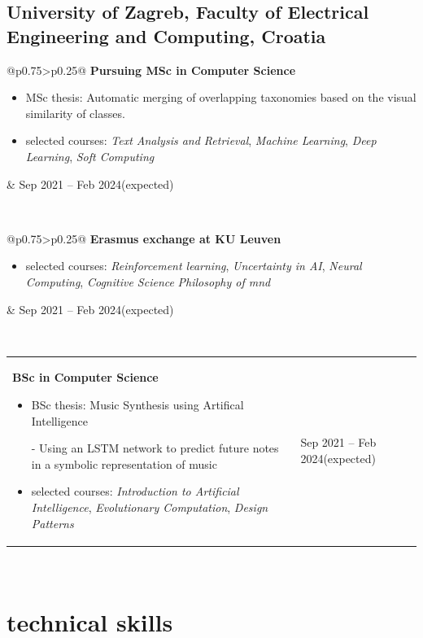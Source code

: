 \documentclass[a4paper]{article}
\makeatletter
\newlength{\tablewidth}
\newenvironment{period}[2]{%
\newcommand{\sarma}{#2}%
\setlength{\tablewidth}{\linewidth}
\addtolength{\tablewidth}{-2\tabcolsep}
\begin{tabular}{@{}p{0.75\tablewidth}>{\raggedleft\arraybackslash}p{0.25\tablewidth}@{}}%
#1 \newline
\begin{itemize}
}{%
\end{itemize} & \sarma \\%
\end{tabular}\\
}
\makeatother
\begin{document}
\subsection{\textbf{University of Zagreb, Faculty of Electrical Engineering and Computing}, Croatia}
\begin{period}{\textbf{Pursuing MSc in Computer Science}}{Sep 2021 -- Feb 2024\linebreak(expected)}
    \item MSc thesis: Automatic merging of overlapping taxonomies based on the visual similarity of classes.
    \item selected courses:
        \textit{Text Analysis and Retrieval},
        \textit{Machine Learning},
        \textit{Deep Learning},
        \textit{Soft Computing}
\end{period}
\begin{period}{\hspace{12} \textbf{Erasmus exchange at KU Leuven}}{Sep 2022 - Jul 2023}
\item selected courses:
        \textit{Reinforcement learning},
        \textit{Uncertainty in AI},
        \textit{Neural Computing},
        \textit{Cognitive Science}
        \textit{Philosophy of mnd}
        
\end{period}
\begin{period}{\textbf{BSc in Computer Science}}{Sep 2016 -- Sep 2021}
    \item BSc thesis: Music Synthesis using Artifical Intelligence 
    
    - Using an LSTM network to predict future notes in a symbolic representation of music
    
    \item selected courses:
        \textit{Introduction to Artificial Intelligence},
        \textit{Evolutionary Computation},
        \textit{Design Patterns}
\end{period}

\vspace{-1.5em}

\section{technical skills}

\vspace{-1.5em}
\end{document}
